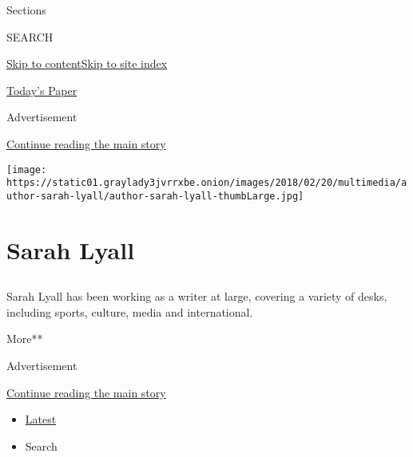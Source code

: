 Sections

SEARCH

\protect\hyperlink{site-content}{Skip to
content}\protect\hyperlink{site-index}{Skip to site index}

\href{https://myaccount.nytimes3xbfgragh.onion/auth/login?response_type=cookie\&client_id=vi}{}

\href{https://www.nytimes3xbfgragh.onion/section/todayspaper}{Today's
Paper}

Advertisement

\protect\hyperlink{after-top}{Continue reading the main story}

\texttt{[image: https://static01.graylady3jvrrxbe.onion/images/2018/02/20/multimedia/author-sarah-lyall/author-sarah-lyall-thumbLarge.jpg]}

\hypertarget{sarah-lyall}{%
\section{Sarah Lyall}\label{sarah-lyall}}

\subsection{}

Sarah Lyall has been working as a writer at large, covering a variety of
desks, including sports, culture, media and international.

More**

Advertisement

\protect\hyperlink{after-mid1}{Continue reading the main story}

\begin{itemize}
\tightlist
\item
  \protect\hyperlink{stream-panel}{Latest}
\item
  Search
\end{itemize}

